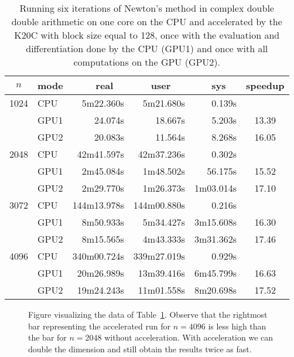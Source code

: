 \documentclass{article}
\begin{document}
\begin{table}[hbt]
\begin{center}
\caption{Running six iterations of Newton's method in complex double double
  arithmetic on one core on the CPU and 
  accelerated by the K20C with block size equal to 128,
  once with the evaluation and differentiation done by the CPU (GPU1)
  and once with all computations on the GPU (GPU2).}
\label{tabnewdd}
\begin{tabular}{cl|rrr|c}
$n$ & mode  &      real~~  &    user ~~  &      sys~~ & speedup \\ \hline
1024 & CPU  &    5m22.360s &   5m21.680s &     0.139s & \\
     & GPU1 &      24.074s &     18.667s &     5.203s & 13.39 \\
     & GPU2 &      20.083s &     11.564s &     8.268s & 16.05 \\ \hline
2048 & CPU  &   42m41.597s &  42m37.236s &     0.302s & \\
     & GPU1 &    2m45.084s &   1m48.502s &    56.175s & 15.52 \\
     & GPU2 &    2m29.770s &   1m26.373s &  1m03.014s & 17.10 \\ \hline
3072 & CPU  &  144m13.978s & 144m00.880s &     0.216s & \\
     & GPU1 &    8m50.933s &   5m34.427s &  3m15.608s & 16.30 \\
     & GPU2 &    8m15.565s &   4m43.333s &  3m31.362s & 17.46 \\ \hline
4096 & CPU  &  340m00.724s & 339m27.019s &     0.929s & \\
     & GPU1 &   20m26.989s &  13m39.416s &  6m45.799s & 16.63 \\
     & GPU2 &   19m24.243s &  11m01.558s &  8m20.698s & 17.52
\end{tabular}
\end{center}
\end{table}

\begin{figure}[hbt]
\begin{center}
\caption{Figure visualizing the data of Table~\ref{tabnewdd}.
Observe that the rightmost bar representing the accelerated run for $n=4096$
is less high than the bar for $n=2048$ without acceleration.
With acceleration we can double the dimension and still obtain
the results twice as fast.}
\label{fignewdd}
\end{center}
\end{figure}
\end{document}
